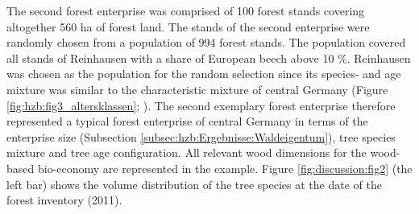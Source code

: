 The second forest enterprise was comprised of 100 forest stands covering altogether 560 ha of forest land. The stands of the second enterprise were randomly chosen from a population of 994 forest stands. The population covered all stands of Reinhausen with a share of European beech above 10 \%. Reinhausen was chosen as the population for the random selection since its species- and age mixture was similar to the characteristic mixture of central Germany (Figure \ref{fig:hzb:fig3_altersklassen}; \citealp{nlf_2017}). The second exemplary forest enterprise therefore represented a typical forest enterprise of central Germany in terms of the enterprise size (Subsection \ref{subsec:hzb:Ergebnisse:Waldeigentum}), tree species mixture and tree age configuration. All relevant wood dimensions for the wood-based bio-economy are represented in the example. Figure \ref{fig:discussion:fig2} (the left bar) shows the volume distribution of the tree species at the date of the forest inventory (2011).

